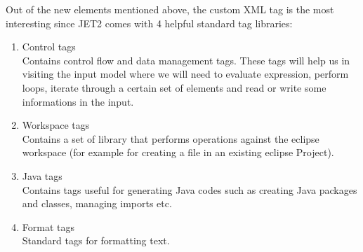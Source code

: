 Out of the new elements mentioned above, the custom XML tag is the most interesting since JET2 comes with 4 helpful standard tag libraries\cite{JET2TAGS}:
\begin{enumerate}
	\item Control tags\\
		    Contains control flow and data management tags. These tags will help us in visiting the input model where we will need to evaluate expression, perform loops,  iterate through a certain set of elements and read or write some informations in the input. 
	\item Workspace tags\\
			  Contains a set of library that performs operations against the eclipse workspace (for example for creating a file in an existing eclipse Project). 
	\item Java tags\\
				Contains tags useful for generating Java codes such as creating Java packages and classes, managing imports etc.
	\item Format tags\\
		    Standard tags for formatting text. 
\end{enumerate}

